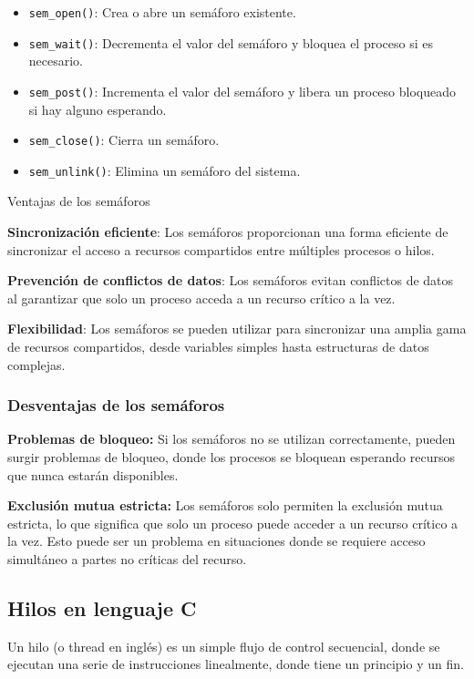 \begin{itemize}
	\item \texttt{sem\_open()}: Crea o abre un semáforo existente.
	\item \texttt{sem\_wait()}: Decrementa el valor del semáforo y bloquea el proceso si es necesario.
	\item \texttt{sem\_post()}: Incrementa el valor del semáforo y libera un proceso bloqueado si hay alguno esperando.
	\item \texttt{sem\_close()}: Cierra un semáforo.
	\item \texttt{sem\_unlink()}: Elimina un semáforo del sistema.
\end{itemize}

Ventajas de los semáforos

\textbf{Sincronización eficiente}: Los semáforos proporcionan una forma eficiente de sincronizar el acceso a recursos compartidos entre múltiples procesos o hilos.

\textbf{Prevención de conflictos de datos}: Los semáforos evitan conflictos de datos al garantizar que solo un proceso acceda a un recurso crítico a la vez.

\textbf{Flexibilidad}: Los semáforos se pueden utilizar para sincronizar una amplia gama de recursos compartidos, desde variables simples hasta estructuras de datos complejas.

\subsubsection{Desventajas de los semáforos}

\textbf{Problemas de bloqueo:} Si los semáforos no se utilizan correctamente, pueden surgir problemas de bloqueo, donde los procesos se bloquean esperando recursos que nunca estarán disponibles.

\textbf{Exclusión mutua estricta:} Los semáforos solo permiten la exclusión mutua estricta, lo que significa que solo un proceso puede acceder a un recurso crítico a la vez. Esto puede ser un problema en situaciones donde se requiere acceso simultáneo a partes no críticas del recurso.

\subsection{Hilos en lenguaje C}

Un hilo (o thread en inglés) es un simple flujo de control secuencial, donde se ejecutan una serie de instrucciones linealmente, donde tiene un principio y un fin.

